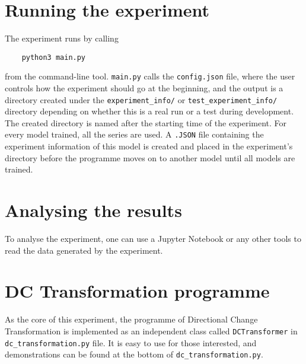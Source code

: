 \section{Running the experiment}
The experiment runs by calling
\begin{verbatim}
    python3 main.py
\end{verbatim}
from the command-line tool. \verb+main.py+ calls the \verb+config.json+ file, where the user controls how the experiment should go at the beginning, and the output is a directory created under the \verb+experiment_info/+ or \verb+test_experiment_info/+ directory depending on whether this is a real run or a test during development. The created directory is named after the starting time of the experiment. For every model trained, all the series are used. A \verb+.JSON+ file containing the experiment information of this model is created and placed in the experiment's directory before the programme moves on to another model until all models are trained.

\section{Analysing the results}
To analyse the experiment, one can use a Jupyter Notebook or any other tools to read the data generated by the experiment.

\section{DC Transformation programme}
As the core of this experiment, the programme of Directional Change Transformation is implemented as an independent class called \verb+DCTransformer+ in \verb+dc_transformation.py+ file. It is easy to use for those interested, and demonstrations can be found at the bottom of \verb+dc_transformation.py+.
